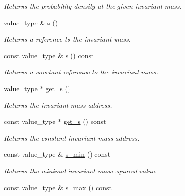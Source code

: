\begin{DoxyCompactItemize}
\begin{DoxyCompactList}\small\item\em Returns the probability density at the given invariant mass. \end{DoxyCompactList}\item 
\hypertarget{a00482_a8bf50336c0da12a27a71eb1154a7012e}{value\-\_\-type \& \hyperlink{a00482_a8bf50336c0da12a27a71eb1154a7012e}{s} ()}\label{a00482_a8bf50336c0da12a27a71eb1154a7012e}

\begin{DoxyCompactList}\small\item\em Returns a reference to the invariant mass. \end{DoxyCompactList}\item 
\hypertarget{a00482_a3da7029554a7cfea182116f7af92ddbc}{const value\-\_\-type \& \hyperlink{a00482_a3da7029554a7cfea182116f7af92ddbc}{s} () const }\label{a00482_a3da7029554a7cfea182116f7af92ddbc}

\begin{DoxyCompactList}\small\item\em Returns a constant reference to the invariant mass. \end{DoxyCompactList}\item 
\hypertarget{a00482_a2134416efc230480ebfa4168cc95421b}{value\-\_\-type $\ast$ \hyperlink{a00482_a2134416efc230480ebfa4168cc95421b}{get\-\_\-s} ()}\label{a00482_a2134416efc230480ebfa4168cc95421b}

\begin{DoxyCompactList}\small\item\em Returns the invariant mass address. \end{DoxyCompactList}\item 
\hypertarget{a00482_acf668beb997d46eb8868240474030859}{const value\-\_\-type $\ast$ \hyperlink{a00482_acf668beb997d46eb8868240474030859}{get\-\_\-s} () const }\label{a00482_acf668beb997d46eb8868240474030859}

\begin{DoxyCompactList}\small\item\em Returns the constant invariant mass address. \end{DoxyCompactList}\item 
\hypertarget{a00482_ac63606d7e64584701295f40792e72404}{const value\-\_\-type \& \hyperlink{a00482_ac63606d7e64584701295f40792e72404}{s\-\_\-min} () const }\label{a00482_ac63606d7e64584701295f40792e72404}

\begin{DoxyCompactList}\small\item\em Returns the minimal invariant mass-\/squared value. \end{DoxyCompactList}\item 
\hypertarget{a00482_a8f90d6b39a671f28db9e84333f90b460}{const value\-\_\-type \& \hyperlink{a00482_a8f90d6b39a671f28db9e84333f90b460}{s\-\_\-max} () const }\label{a00482_a8f90d6b39a671f28db9e84333f90b460}


\end{DoxyCompactItemize}
